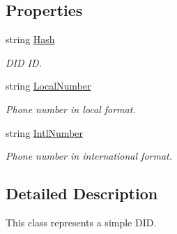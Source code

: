 \subsection*{Properties}
\begin{DoxyCompactItemize}
\item 
string \hyperlink{class_thecallr_api_1_1_objects_1_1_did_1_1_did_for_stat_aaa2e445523c301391033d410b1384e89}{Hash}
\begin{DoxyCompactList}\small\item\em D\+I\+D I\+D. \end{DoxyCompactList}\item 
string \hyperlink{class_thecallr_api_1_1_objects_1_1_did_1_1_did_for_stat_a2f40a26d299bc9950802443410c90bba}{Local\+Number}
\begin{DoxyCompactList}\small\item\em Phone number in local format. \end{DoxyCompactList}\item 
string \hyperlink{class_thecallr_api_1_1_objects_1_1_did_1_1_did_for_stat_af122d6765d9204d750df5099eb8891e6}{Intl\+Number}
\begin{DoxyCompactList}\small\item\em Phone number in international format. \end{DoxyCompactList}\end{DoxyCompactItemize}


\subsection{Detailed Description}
This class represents a simple D\+I\+D. 



